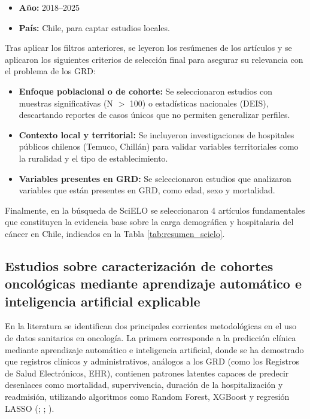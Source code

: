 \begin{itemize}
    \item \textbf{Año:} 2018--2025
    \item \textbf{País:} Chile, para captar estudios locales.
\end{itemize}

Tras aplicar los filtros anteriores, se leyeron los resúmenes de los artículos y se aplicaron los siguientes criterios de selección final para asegurar su relevancia con el problema de los GRD:

\begin{itemize}
    \item \textbf{Enfoque poblacional o de cohorte:} Se seleccionaron estudios con muestras significativas (N $>$ 100) o estadísticas nacionales (DEIS), descartando reportes de casos únicos que no permiten generalizar perfiles.
    \item \textbf{Contexto local y territorial:} Se incluyeron investigaciones de hospitales públicos chilenos (Temuco, Chillán) para validar variables territoriales como la ruralidad y el tipo de establecimiento.
    \item \textbf{Variables presentes en GRD:} Se seleccionaron estudios que analizaron variables que están presentes en GRD, como edad, sexo y mortalidad.
\end{itemize}

Finalmente, en la búsqueda de SciELO se seleccionaron 4 artículos fundamentales que constituyen la evidencia base sobre la carga demográfica y hospitalaria del cáncer en Chile, indicados en la Tabla \ref{tab:resumen_scielo}.


\subsection{Estudios sobre caracterización de cohortes oncológicas mediante aprendizaje automático e inteligencia artificial explicable}

En la literatura se identifican dos principales corrientes metodológicas en el uso de datos sanitarios en oncología. La primera corresponde a la predicción clínica mediante aprendizaje automático e inteligencia artificial, donde se ha demostrado que registros clínicos y administrativos, análogos a los GRD (como los Registros de Salud Electrónicos, EHR), contienen patrones latentes capaces de predecir desenlaces como mortalidad, supervivencia, duración de la hospitalización y readmisión, utilizando algoritmos como Random Forest, XGBoost y regresión LASSO (\cite{article2}; \cite{article3}; \cite{article10}).

